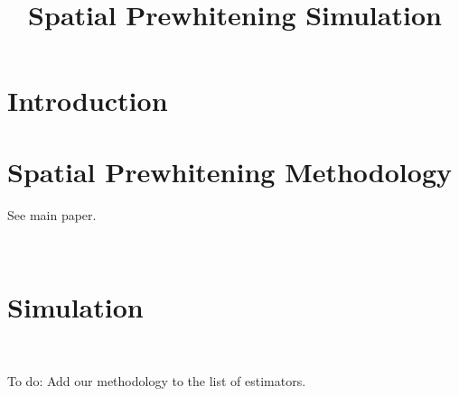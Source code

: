 \documentclass[preprint]{imsart}
\numberwithin{equation}{section}
\theoremstyle{plain}
\theoremstyle{definition}
\renewcommand{\(}{\left(}
\renewcommand{\)}{\right)}
\renewcommand{\[}{\left[}
\renewcommand{\]}{\right]}
\begin{document}
\begin{frontmatter}
\title{\Large Spatial Prewhitening Simulation
}





\linespread{1.25}











\end{frontmatter}





\section{Introduction}
\label{intro}

\section{Spatial Prewhitening Methodology}

See main paper. 

\






\section{Simulation}
\label{simulation}

\

To do:  Add our methodology to the list of estimators.

\





\end{document}
